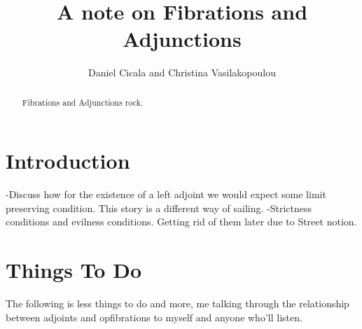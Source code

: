 \documentclass{amsart}
\begin{document}
\title{A note on Fibrations and Adjunctions}

\author{Daniel Cicala and Christina Vasilakopoulou} 
\address{Departement of Mathematics, University of California, Riverside, 900 University Avenue, 92521, USA}

\begin{abstract}
Fibrations and Adjunctions rock.
\end{abstract}

\maketitle

\tableofcontents


\section{Introduction}

-Discuss how for the existence of a left adjoint we would expect some limit preserving condition. This story is a different way of sailing.
-Strictness conditions and evilness conditions. Getting rid of them later due to Street notion.

\section*{Things To Do}

The following is less things to do and more, me talking
through the relationship between adjoints and opfibrations
to myself and anyone who'll listen.
\end{document}
